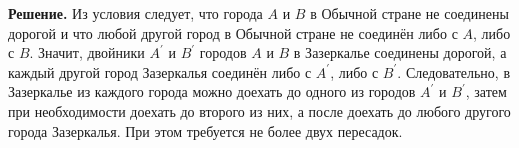 \textbf{Решение.}
Из условия следует, что города $A$ и $B$ в Обычной стране не соединены дорогой и что любой другой город в Обычной стране не соединён либо с $A$, либо с $B$. Значит, двойники $A^{\prime}$ и $B^{\prime}$ городов $A$ и $B$ в Зазеркалье соединены дорогой, а каждый другой город Зазеркалья соединён либо с $A^{\prime}$, либо с $B^{\prime}$. Следовательно, в Зазеркалье из каждого города можно доехать до одного из городов $A^{\prime}$ и $B^{\prime}$, затем при необходимости доехать до второго из них, а после доехать до любого другого города Зазеркалья. При этом требуется не более двух пересадок.

